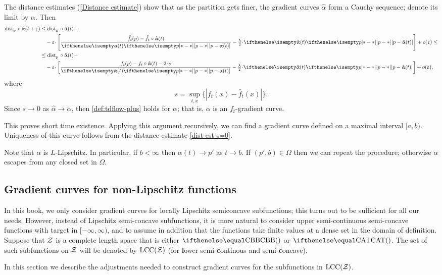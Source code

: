 The distance estimates (\ref{Distance estimate}) show that as the partition gets finer, the gradient curves $\hat\alpha$ form a Cauchy sequence; denote its limit by $\alpha$.
Then
\begin{align*}
\distfun{p}{}{}\circ\hat\alpha(t+\eps)
&\le 
\distfun{p}{}{}\circ\hat\alpha(t)-
\\
&\quad
-\eps\cdot \left[\frac{\hat f_t(p)-\hat f_t\circ\hat\alpha(t)}{\dist{p}{\alpha(t)}{}}-\tfrac\lambda2\cdot \dist{p}{\hat\alpha(t)}{}\right] 
+o(\eps)\le
\\
&\le 
\distfun{p}{}{}\circ\hat\alpha(t)-
\\
&\quad
-\eps\cdot \left[\frac{f_t(p)-f_t\circ\hat\alpha(t)-2\cdot s}{\dist{p}{\alpha(t)}{}}-\tfrac\lambda2\cdot \dist{p}{\hat\alpha(t)}{}\right]
+o(\eps),
\end{align*}
where 
\[s=\sup_{t,x} \{|f_t(x)-\hat f_t(x)|\}.\]
Since $s\to 0$ as $\hat\alpha\to \alpha$, then \ref{def:tdflow-plus} holds for $\alpha$;
that is, $\alpha$ is an $f_t$-gradient curve.

This proves short time existence.
Applying this argument recursively, we can find a gradient curve defined on a maximal interval $[a,b)$.
Uniqueness of this curve follows from the distance estimate \ref{dist-est-s=0}. 

Note that $\alpha$ is $L$-Lipschitz.
In particular, if $b<\infty$ then $\alpha(t)\to p'$ as $t\to b$.
If $(p',b)\in \Omega$ then we can repeat the procedure; otherwise $\alpha$ escapes from any closed set in $\Omega$. 
\qeds

\subsection*{Gradient curves for non-Lipschitz functions}\label{sec:non-lip}

In this book, we only consider gradient curves for locally Lipschitz semiconcave subfunctions;
this turns out to be sufficient for all our needs.
However, 
instead of Lipschitz semi-concave subfunctions,
it is more natural to consider upper semi-continuous semi-concave functions
with target in $[-\infty,\infty)$,
and to assume in addition that 
the functions take finite values at a dense set in the domain of definition.
Suppose that $\mathcal{Z}$ is a complete length space that is either $\Alex{}$ or $\CAT{}$.
The set of such subfunctions on $\mathcal{Z}$ will be denoted by 
$\mathrm{LCC}(\mathcal{Z})$ (for \textbf{l}ower semi-\textbf{c}ontinous and semi-\textbf{c}oncave).

In this section we describe the adjustments needed
to construct gradient curves for the subfunctions in $\mathrm{LCC}(\mathcal{Z})$.

